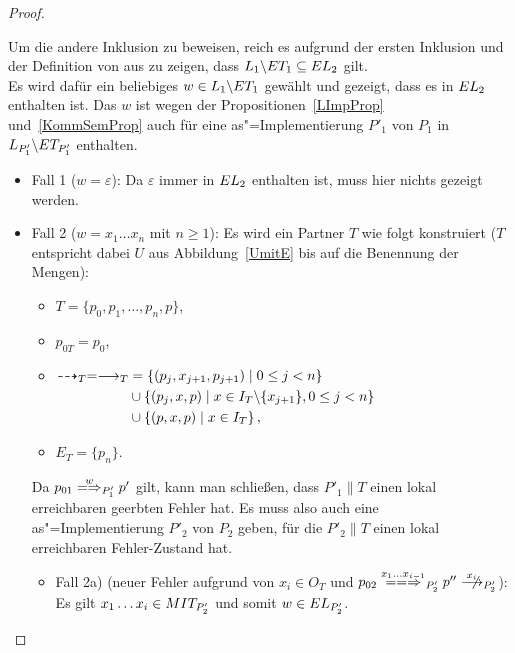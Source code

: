 \begin{proof}
\begin{itemize}
  \end{itemize}
  Um die andere Inklusion zu beweisen, reich es aufgrund der ersten Inklusion
  und der Definition von \EL{} aus zu zeigen, dass $L_1\backslash ET
  _1\subseteq EL _2$ gilt.\\
  Es wird dafür ein beliebiges $w\in L_1\backslash ET _1$ gewählt und gezeigt,
  dass es in $EL _2$ enthalten ist. Das $w$ ist wegen der
  Propositionen~\ref{LImpProp} und~\ref{KommSemProp} auch für eine
  as"=Implementierung $P'_1$ von $P_1$ in $L_{P'_1}\backslash ET _{P'_1}$
  enthalten.
  \begin{itemize}
    \item Fall 1 ($w=\varepsilon$): Da $\varepsilon$ immer in $EL _2$
      enthalten ist, muss hier nichts gezeigt werden.
    \item Fall 2 ($w=x_1\dots x_n$ mit $n\geq 1$): Es wird ein Partner $T$ wie
      folgt konstruiert ($T$ entspricht dabei $U$ aus Abbildung~\ref{UmitE} bis
      auf die Benennung der Mengen):
      \begin{itemize}
        \item $T=\{p_0,p_1,\dots ,p_n,p\}$,
        \item $p_{0T}=p_0$,
        \item $\begin{aligned}[t]
            \may _T = \must _T&=\left\{(p_j,x_{j+1},p_{j+1})\mid 0\leq j<
            n\right\}\\
            &\cup\left\{(p_j,x,p)\mid x\in I_T\backslash\{x_{j+1}\},0\leq j<
            n\right\}\\
            &\cup\left\{(p,x,p)\mid x\in I_T\right\},
        \end{aligned}$
        \item $E_T=\{p_n\}$.
      \end{itemize}
      Da $p_{01} \weakmay[w]_{P'_1} p'$ gilt, kann man schließen, dass
      $P'_1\|T$ einen lokal erreichbaren geerbten Fehler hat. Es muss also auch
      eine as"=Implementierung $P'_2$ von $P_2$ geben, für die $P'_2\|T$ einen
      lokal erreichbaren Fehler-Zustand hat.
      \begin{itemize}
        \item Fall 2a) \big(neuer Fehler aufgrund von $x_i\in O_T$ und $p_{02}
          \lweakmay[x_1\dots x_{i-1}]_{P'_2}p''\hspace{0.25cm} \not
          \hspace{-0.25cm} \must[x_i]_{P'_2}$\big): Es
          gilt $x_1\dots x_i\in MIT _{P'_2}$ und somit $w\in EL _{P'_2}$.

\end{itemize}
\end{itemize}
\end{proof}
